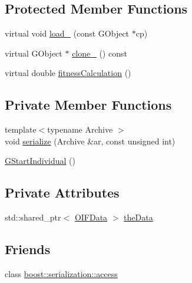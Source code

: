 \subsection*{Protected Member Functions}
\begin{DoxyCompactItemize}
\item 
virtual void \hyperlink{classGem_1_1Geneva_1_1GStartIndividual_a722b0e83493f9e06e1facca0f2909667}{load\_\-} (const GObject $\ast$cp)
\item 
virtual GObject $\ast$ \hyperlink{classGem_1_1Geneva_1_1GStartIndividual_a089f4f854c65668d4af94062d494ec34}{clone\_\-} () const 
\item 
virtual double \hyperlink{classGem_1_1Geneva_1_1GStartIndividual_a0ca77799d18c829f22538c1ba08c0242}{fitnessCalculation} ()
\end{DoxyCompactItemize}
\subsection*{Private Member Functions}
\begin{DoxyCompactItemize}
\item 
{\footnotesize template$<$typename Archive $>$ }\\void \hyperlink{classGem_1_1Geneva_1_1GStartIndividual_a9259159c50c1e5084120947e0598bda3}{serialize} (Archive \&ar, const unsigned int)
\item 
\hyperlink{classGem_1_1Geneva_1_1GStartIndividual_a8942d3c6bfa0399fdfcd8025e03107fb}{GStartIndividual} ()
\end{DoxyCompactItemize}
\subsection*{Private Attributes}
\begin{DoxyCompactItemize}
\item 
std::shared\_\-ptr$<$ \hyperlink{classOIFData}{OIFData} $>$ \hyperlink{classGem_1_1Geneva_1_1GStartIndividual_a38407e1c34927cd8675f7f289d20bead}{theData}
\end{DoxyCompactItemize}
\subsection*{Friends}
\begin{DoxyCompactItemize}
\item 
class \hyperlink{classGem_1_1Geneva_1_1GStartIndividual_ac98d07dd8f7b70e16ccb9a01abf56b9c}{boost::serialization::access}
\end{DoxyCompactItemize}


